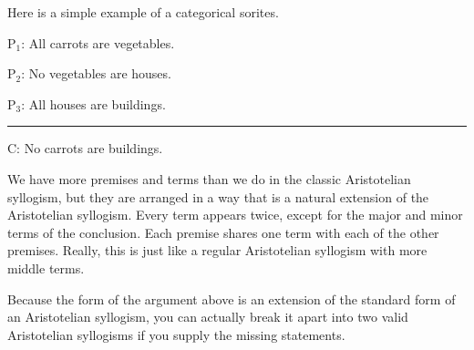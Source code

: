 {Here is a simple example of a categorical sorites.

\begin{earg}
\item[P$_1$:] All carrots are vegetables.
\item[P$_2$:] No vegetables are houses. %
\item[P$_3$:] All houses are buildings. 	
\vspace{-.5em}
\item [] \rule{0.3\linewidth}{.5pt} 
\item[C:] No carrots are buildings. 
\end{earg}

We have more premises and terms than we do in the classic Aristotelian syllogism, but they are arranged in a way that is a natural extension of the Aristotelian syllogism. Every term appears twice, except for the major and minor terms of the conclusion. Each premise shares one term with each of the other premises. Really, this is just like a regular Aristotelian syllogism with more middle terms. 

Because the form of the argument above is an extension of the standard form of an Aristotelian syllogism, you can actually break it apart into two valid Aristotelian syllogisms if you supply the missing statements.


}
